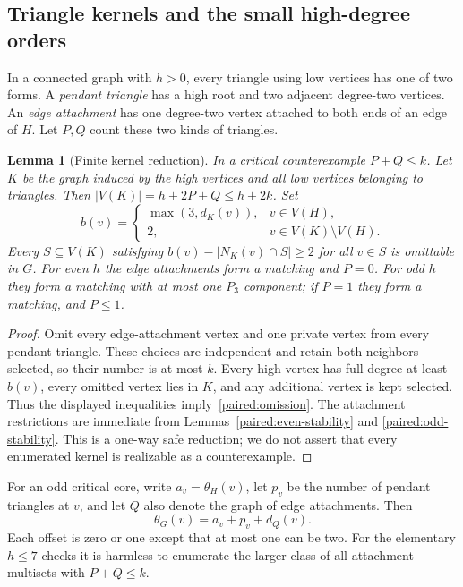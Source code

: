 \documentclass[11pt,a4paper]{article}
\newtheorem{lemma}[theorem]{Lemma}
\theoremstyle{definition}\newtheorem{definition}[theorem]{Definition}
\theoremstyle{remark}\newtheorem{remark}[theorem]{Remark}
\begin{document}
\subsection{Triangle kernels and the small high-degree orders}
\label{paired:kernel-section}

In a connected graph with $h>0$, every triangle using low vertices
has one of two forms. A \emph{pendant triangle} has a high root and
two adjacent degree-two vertices. An \emph{edge attachment} has one
degree-two vertex attached to both ends of an edge of $H$. Let $P,Q$
count these two kinds of triangles.

\begin{lemma}[Finite kernel reduction]\label{paired:kernel}
In a critical counterexample $P+Q\le k$. Let $K$ be the graph induced
by the high vertices and all low vertices belonging to triangles.
Then $|V(K)|=h+2P+Q\le h+2k$. Set
\[
 b(v)=\begin{cases}\max(3,d_K(v)),&v\in V(H),\\2,&v\in V(K)\setminus V(H).
 \end{cases}
\]
Every $S\subseteq V(K)$ satisfying
$b(v)-|N_K(v)\cap S|\ge2$ for all $v\in S$ is omittable in $G$.
For even $h$ the edge attachments form a matching and $P=0$.
For odd $h$ they form a matching with at most one $P_3$ component;
if $P=1$ they form a matching, and $P\le1$.
\end{lemma}
\begin{proof}
Omit every edge-attachment vertex and one private vertex from every
pendant triangle. These choices are independent and retain both
neighbors selected, so their number is at most $k$. Every high
vertex has full degree at least $b(v)$, every omitted vertex lies
in $K$, and any additional vertex is kept selected. Thus the displayed
inequalities imply~\eqref{paired:omission}. The attachment restrictions
are immediate from Lemmas~\ref{paired:even-stability} and
\ref{paired:odd-stability}. This is a one-way safe reduction; we do
not assert that every enumerated kernel is realizable as a counterexample.
\end{proof}

For an odd critical core, write $a_v=\theta_H(v)$, let $p_v$ be the
number of pendant triangles at $v$, and let $Q$ also denote the graph
of edge attachments. Then
\begin{equation}\label{paired:offset}
 \theta_G(v)=a_v+p_v+d_Q(v).
\end{equation}
Each offset is zero or one except that at most one can be two. For
the elementary $h\le7$ checks it is harmless to enumerate the larger
class of all attachment multisets with $P+Q\le k$.
\end{document}
